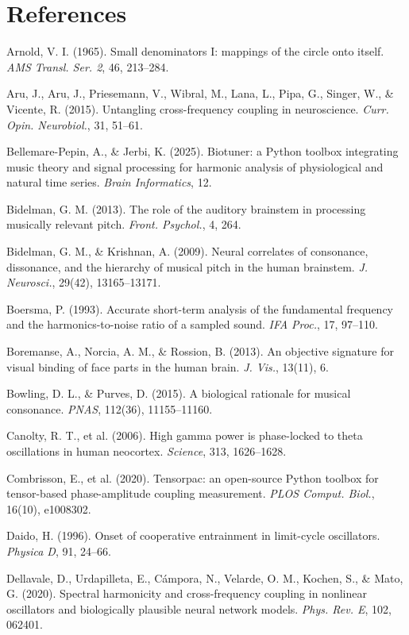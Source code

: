 \documentclass[11pt]{article}
\begin{document}
\section*{References}
\begingroup\small
\begin{list}{}{\setlength{\itemsep}{1pt}\setlength{\leftmargin}{1.2em}\setlength{\itemindent}{-1.2em}}
\item Arnold, V. I. (1965). Small denominators I: mappings of the circle onto itself. \emph{AMS Transl. Ser. 2}, 46, 213–284.
\item Aru, J., Aru, J., Priesemann, V., Wibral, M., Lana, L., Pipa, G., Singer, W., \& Vicente, R. (2015). Untangling cross-frequency coupling in neuroscience. \emph{Curr. Opin. Neurobiol.}, 31, 51–61.
\item Bellemare-Pepin, A., \& Jerbi, K. (2025). Biotuner: a Python toolbox integrating music theory and signal processing for harmonic analysis of physiological and natural time series. \emph{Brain Informatics}, 12.
\item Bidelman, G. M. (2013). The role of the auditory brainstem in processing musically relevant pitch. \emph{Front. Psychol.}, 4, 264.
\item Bidelman, G. M., \& Krishnan, A. (2009). Neural correlates of consonance, dissonance, and the hierarchy of musical pitch in the human brainstem. \emph{J. Neurosci.}, 29(42), 13165–13171.
\item Boersma, P. (1993). Accurate short-term analysis of the fundamental frequency and the harmonics-to-noise ratio of a sampled sound. \emph{IFA Proc.}, 17, 97–110.
\item Boremanse, A., Norcia, A. M., \& Rossion, B. (2013). An objective signature for visual binding of face parts in the human brain. \emph{J. Vis.}, 13(11), 6.
\item Bowling, D. L., \& Purves, D. (2015). A biological rationale for musical consonance. \emph{PNAS}, 112(36), 11155–11160.
\item Canolty, R. T., et al. (2006). High gamma power is phase-locked to theta oscillations in human neocortex. \emph{Science}, 313, 1626–1628.
\item Combrisson, E., et al. (2020). Tensorpac: an open-source Python toolbox for tensor-based phase-amplitude coupling measurement. \emph{PLOS Comput. Biol.}, 16(10), e1008302.
\item Daido, H. (1996). Onset of cooperative entrainment in limit-cycle oscillators. \emph{Physica D}, 91, 24–66.
\item Dellavale, D., Urdapilleta, E., Cámpora, N., Velarde, O. M., Kochen, S., \& Mato, G. (2020). Spectral harmonicity and cross-frequency coupling in nonlinear oscillators and biologically plausible neural network models. \emph{Phys. Rev. E}, 102, 062401.

\end{list}
\end{document}
